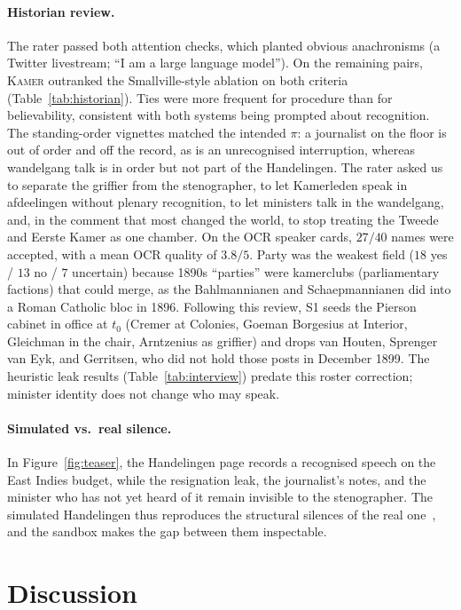 \documentclass[sigconf,review,anonymous]{acmart}
\newcommand{\sys}{\textsc{Kamer}}
\begin{document}
\paragraph{Historian review.} The rater passed both attention checks,
which planted obvious anachronisms (a Twitter livestream; ``I am a large
language model''). On the remaining pairs, \sys{} outranked the
Smallville-style ablation on both criteria (Table~\ref{tab:historian}).
Ties were more frequent for procedure than for believability, consistent
with both systems being prompted about recognition. The standing-order
vignettes matched the intended $\pi$: a journalist on the floor is out of
order and off the record, as is an unrecognised interruption, whereas
wandelgang talk is in order but not part of the Handelingen. The rater
asked us to separate the griffier from the stenographer, to let Kamerleden
speak in afdeelingen without plenary recognition, to let ministers talk in
the wandelgang, and, in the comment that most changed the world, to stop
treating the Tweede and Eerste Kamer as one chamber. On the OCR speaker
cards, $27/40$ names were accepted, with a mean OCR quality of $3.8/5$.
Party was the weakest field ($18$ yes / $13$ no / $7$ uncertain) because
1890s ``parties'' were kamerclubs (parliamentary factions) that could
merge, as the Bahlmannianen and Schaepmannianen did into a Roman Catholic
bloc in 1896. Following this review, S1 seeds the Pierson cabinet in office
at $t_0$ (Cremer at Colonies, Goeman Borgesius at Interior, Gleichman in
the chair, Arntzenius as griffier) and drops van Houten, Sprenger van Eyk,
and Gerritsen, who did not hold those posts in December 1899. The
heuristic leak results (Table~\ref{tab:interview}) predate this roster
correction; minister identity does not change who may speak.

\paragraph{Simulated vs.\ real silence.} In Figure~\ref{fig:teaser}, the
Handelingen page records a recognised speech on the East Indies budget,
while the resignation leak, the journalist's notes, and the minister who
has not yet heard of it remain invisible to the stenographer. The
simulated Handelingen thus reproduces the structural silences of the real
one~\cite{trouillot1995silencing}, and the sandbox makes the gap between
them inspectable.

\section{Discussion}
\label{sec:discussion}
\end{document}
